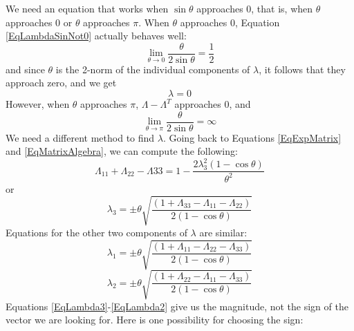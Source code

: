 \documentclass[10pt,letterpaper,oneside,notitlepage]{article}
\begin{document}
We need an equation that works when $\sin\theta$ approaches 0, that is, when $\theta$ approaches 0 or $\theta$ approaches $\pi$. When $\theta$ approaches 0, Equation \ref{EqLambdaSinNot0} actually behaves well: 
\begin{equation}
\lim_{\theta \to 0}\frac{\theta}{2\sin\theta} = \frac{1}{2}
\end{equation}
and since $\theta$ is the 2-norm of the individual components of $\lambda$, it follows that they approach zero, and we get
\begin{equation}
\label{EqLambdaTheta0}
\lambda = 0
\end{equation}
However, when $\theta$ approaches $\pi$, $\Lambda - \Lambda^T$ approaches 0, and 
\begin{equation}
\lim_{\theta \to \pi}\frac{\theta}{2\sin\theta} = \infty
\end{equation}
We need a different method to find $\lambda$. Going back to Equations \ref{EqExpMatrix} and \ref{EqMatrixAlgebra}, we can compute the following:
\begin{equation}
\Lambda_{11}+\Lambda_{22}-\Lambda{33} = 1 - \frac{2\lambda_3^2(1-\cos\theta)}{\theta^2} 
\end{equation}
or
\begin{equation}
\label{EqLambda3}
\lambda_3 = \pm \theta\sqrt{ \frac{\left(1 + \Lambda_{33} - \Lambda_{11} - \Lambda_{22}\right)}{2\left(1-\cos\theta\right)}   }
\end{equation}
Equations for the other two components of $\lambda$ are similar:
\begin{equation}
\label{EqLambda1}
\lambda_1 = \pm \theta\sqrt{ \frac{\left(1 + \Lambda_{11} - \Lambda_{22} - \Lambda_{33}\right)}{2\left(1-\cos\theta\right)}   }
\end{equation}
\begin{equation}
\label{EqLambda2}
\lambda_2 = \pm \theta\sqrt{ \frac{\left(1 + \Lambda_{22} - \Lambda_{11} - \Lambda_{33}\right)}{2\left(1-\cos\theta\right)}   }
\end{equation}
Equations \ref{EqLambda3}-\ref{EqLambda2} give us the magnitude, not the sign of the vector we are looking for. Here is one possibility for choosing the sign:
\end{document}
